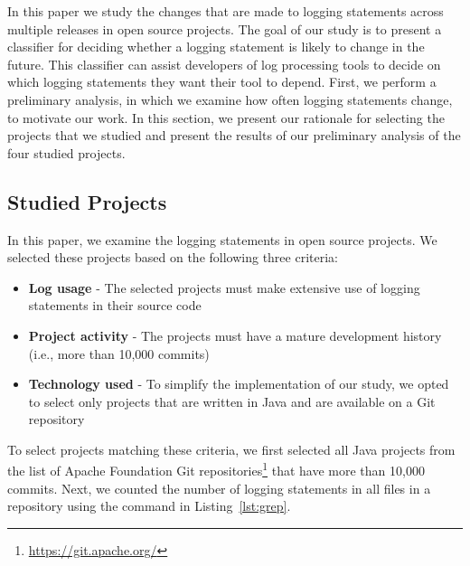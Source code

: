 In this paper we study the changes that are made to logging statements across multiple releases in open source projects. The goal of our study is to present a classifier for deciding whether a logging statement is likely to change in the future. This classifier can assist developers of log processing tools to decide on which logging statements they want their tool to depend. %
First, we perform a preliminary analysis, in which we examine how often logging statements change, to motivate our work. In this section, we present our rationale for selecting the projects that we studied and present the results of our preliminary analysis of the four studied projects. 

\subsection{Studied Projects}
In this paper, we examine the logging statements in open source projects. We selected these projects based on the following three criteria:
\begin{itemize}
	\item \textbf{Log usage} - The selected projects must make extensive use of logging statements in their source code
	\item \textbf{Project activity} - The projects must have a mature development history (i.e., more than 10,000 commits)
	\item \textbf{Technology used} - To simplify the implementation of our study, we opted to select only projects that are written in Java and are available on a Git repository
\end{itemize}

To select projects matching these criteria, we first selected all Java projects from the list of Apache Foundation Git repositories\footnote{\url{https://git.apache.org/}} that have more than 10,000 commits. Next, we counted the number of logging statements in all  files in a repository using the  command in Listing~\ref{lst:grep}.

